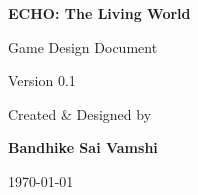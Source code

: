 \begin{titlepage}

\centering

\vspace*{2cm}

{\Huge\bfseries ECHO: The Living World\par}

\vspace{0.8cm}

{\Large Game Design Document\par}

\vspace{2cm}

Version 0.1

\vfill

Created \& Designed by

\vspace{0.3cm}

{\Large\bfseries Bandhike Sai Vamshi}

\vfill

\today

\end{titlepage}
